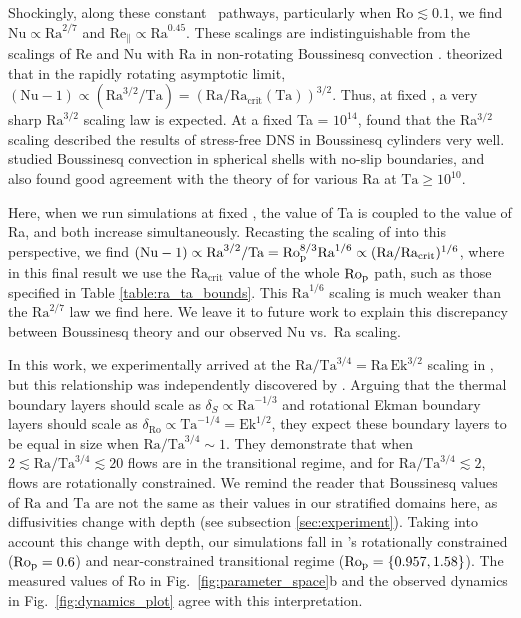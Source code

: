 Shockingly, along these constant \pro$\,$ pathways, particularly when $\text{Ro} \lesssim 0.1$, 
we find $\text{Nu} \propto \text{Ra}^{2/7}$ and $\text{Re}_\parallel \propto \text{Ra}^{0.45}$.
These scalings are indistinguishable from the scalings of
Re and Nu with Ra in non-rotating Boussinesq convection \cite{ahlers&all2009}.  
\cite{julien&all2012} theorized that in the rapidly rotating
asymptotic limit, $(\text{Nu} - 1) \propto (\text{Ra}^{3/2}/\text{Ta}) = (\text{Ra}/\text{Ra}_{\text{crit}}(\text{Ta}))^{3/2}$. Thus,
at fixed , a very sharp $\text{Ra}^{3/2}$ scaling law is expected. 
At a fixed Ta = $10^{14}$, \cite{stellmach&all2014} found that the Ra$^{3/2}$ scaling described
the results of stress-free DNS in Boussinesq cylinders very well.  \cite{gastine&all2016} 
studied Boussinesq convection in spherical shells with no-slip boundaries, and also found 
good agreement with the theory of \cite{julien&all2012} for various Ra at $\text{Ta} \geq 10^{10}$.

Here, when we run simulations at fixed \pro, the value of Ta is coupled to the value of Ra, and both increase simultaneously.
Recasting the scaling of 
\cite{julien&all2012} into this perspective, we find 
$(\text{Nu} - 1) \propto \text{Ra}^{3/2}/\text{Ta} = \text{Ro}_{\text{p}}^{8/3}\text{Ra}^{1/6} \propto (\text{Ra}/\text{Ra}_{\text{crit}})^{1/6}$, 
where in this final result we use the $\text{Ra}_{\text{crit}}$ value of the whole $\text{Ro}_{\text{p}}$ path, such as those
specified in Table \ref{table:ra_ta_bounds}.
This $\text{Ra}^{1/6}$ scaling is much weaker than the $\text{Ra}^{2/7}$ law we find here. 
We leave it to future work to explain this discrepancy between
Boussinesq theory and our observed Nu vs.~Ra scaling.

In this work, we experimentally arrived at the 
$\text{Ra}/\text{Ta}^{3/4} = \text{Ra}\,\text{Ek}^{3/2}$
scaling in \pro, but this relationship was independently
discovered by \cite{king&all2012}. Arguing that the thermal boundary layers should
scale as $\delta_{S} \propto \text{Ra}^{-1/3}$ and rotational Ekman boundary layers
should scale as $\delta_{\text{Ro}} \propto \text{Ta}^{-1/4} = \text{Ek}^{1/2}$, they
expect these boundary layers to be equal in size when $\text{Ra}/\text{Ta}^{3/4} \sim 1$.
They demonstrate that when $2 \lesssim\text{Ra}/\text{Ta}^{3/4} \lesssim 20$ flows are in the
transitional regime, and for $\text{Ra}/\text{Ta}^{3/4} \lesssim 2$, flows are rotationally
constrained. We remind the reader that Boussinesq values of $\text{Ra}$ and $\text{Ta}$ are 
not the same as their
values in our stratified domains here, as diffusivities change with depth (see subsection \ref{sec:experiment}). 
Taking into account this change with depth,
our simulations fall in \cite{king&all2012}'s rotationally constrained
($\text{Ro}_{\text{p}} = 0.6$) and near-constrained transitional regime ($\text{Ro}_{\text{p}} = \{0.957, 1.58\}$).
The measured values of Ro in Fig.~\ref{fig:parameter_space}b and the observed dynamics
in Fig.~\ref{fig:dynamics_plot} agree with this interpretation.

